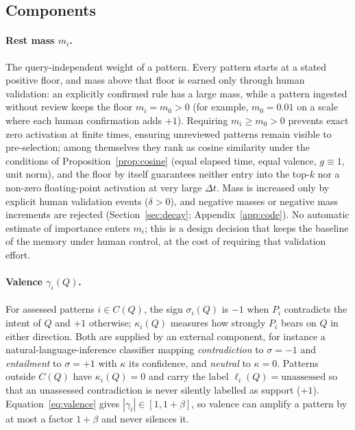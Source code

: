 \documentclass[11pt]{article}
\theoremstyle{remark}
\begin{document}
\subsection{Components}

\paragraph{Rest mass $m_i$.}
The query-independent weight of a pattern. Every pattern starts at a stated positive floor, and mass above that floor is earned only through human validation: an explicitly confirmed rule has a large mass, while a pattern ingested without review keeps the floor $m_i = m_0 > 0$ (for example, $m_0 = 0.01$ on a scale where each human confirmation adds $+1$). Requiring $m_i \ge m_0 > 0$ prevents exact zero activation at finite times, ensuring unreviewed patterns remain visible to pre-selection; among themselves they rank as cosine similarity under the conditions of Proposition~\ref{prop:cosine} (equal elapsed time, equal valence, $g\equiv 1$, unit norm), and the floor by itself guarantees neither entry into the top-$k$ nor a non-zero floating-point activation at very large $\Delta t$. Mass is increased only by explicit human validation events ($\delta > 0$), and negative masses or negative mass increments are rejected (Section~\ref{sec:decay}; Appendix~\ref{app:code}). No automatic estimate of importance enters $m_i$; this is a design decision that keeps the baseline of the memory under human control, at the cost of requiring that validation effort.

\paragraph{Valence $\gamma_i(Q)$.}
For assessed patterns $i\in C(Q)$, the sign $\sigma_i(Q)$ is $-1$ when $P_i$ contradicts the intent of $Q$ and $+1$ otherwise; $\kappa_i(Q)$ measures how strongly $P_i$ bears on $Q$ in either direction. Both are supplied by an external component, for instance a natural-language-inference classifier mapping \emph{contradiction} to $\sigma=-1$ and \emph{entailment} to $\sigma=+1$ with $\kappa$ its confidence, and \emph{neutral} to $\kappa=0$. Patterns outside $C(Q)$ have $\kappa_i(Q)=0$ and carry the label $\ell_i(Q)=\text{unassessed}$ so that an unassessed contradiction is never silently labelled as support ($+1$). Equation~\eqref{eq:valence} gives $|\gamma_i|\in[1,1+\beta]$, so valence can amplify a pattern by at most a factor $1+\beta$ and never silences it.
\end{document}
